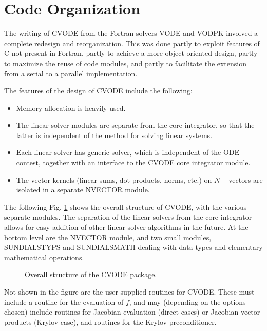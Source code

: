 \section{Code Organization}

The writing of CVODE from the Fortran solvers VODE and VODPK involved
a complete redesign and reorganization.  This was done partly to
exploit features of C not present in Fortran, partly to achieve a more
object-oriented design, partly to maximize the reuse of code modules,
and partly to facilitate the extension from a serial to a parallel
implementation.

The features of the design of CVODE include the following:
\vspace*{-.19in}
\begin{itemize}
\item Memory allocation is heavily used.
\item The linear solver modules are separate from the core integrator,
so that the latter is independent of the method for solving linear
systems.
\item Each linear solver has generic solver, which is independent of
the ODE contest, together with an interface to the CVODE core
integrator module.
\item The vector kernels (linear sums, dot products, norms, etc.) on
$N-$vectors are isolated in a separate NVECTOR module.
\end{itemize}

The following Fig. \ref{fig-cvorg} shows the overall structure of
CVODE, with the various separate modules.  The separation of the
linear solvers from the core integrator allows for easy addition of
other linear solver algorithms in the future.  At the bottom level are
the NVECTOR module, and two small modules, SUNDIALSTYPS and
SUNDIALSMATH dealing with data types and elementary mathematical
operations.

\begin{figure}[p]
\centerline{}
\vspace{0.8in}
\caption{Overall structure of the CVODE package.}
\label{fig-cvorg}
\end{figure}

Not shown in the figure are the user-supplied routines for CVODE.
These must include a routine for the evaluation of $f$, and may
(depending on the options chosen) include routines for Jacobian
evaluation (direct cases) or Jacobian-vector products (Krylov case),
and routines for the Krylov preconditioner.


